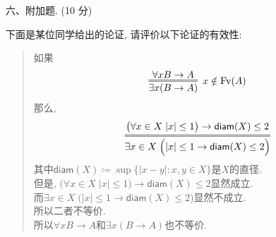 \documentclass[UTF8,11pt,colorlinks,aspectratio=43]{beamer}%
\DeclareMathOperator{\Fv}{Fv}
\begin{document}
\begin{frame}\frametitle{}

六、附加题. (10 分)
\begin{block}{}
下面是某位同学给出的论证, 请评价以下论证的有效性: 
	\begin{quote}
	如果
	\[\infer=[x\notin \Fv(A)]{\exists x(B\to A)}{\forall x B\to A}
	\]
	那么, 
	\[\infer={\exists x\in X\; \Big(|x|\leq 1\to \mathsf{diam}(X)\leq 2\Big)}{\big(\forall x\in X \; |x|\leq 1\big)\to \mathsf{diam}(X)\leq 2}\]
	其中$\mathsf{diam}(X)\coloneq \sup\big\{|x-y|:x,y\in X\big\}$是$X$的直径. \\
  但是, $\big(\forall x\in X \; |x|\leq 1\big)\to \mathsf{diam}(X)\leq 2$显然成立.\\ 
	而$\exists x\in X\; \Big(|x|\leq 1\to \mathsf{diam}(X)\leq 2\Big)$显然不成立.\\ 
	所以二者不等价. \\ 
	所以$\forall x B\to A$和$\exists x(B\to A)$也不等价. 
	\end{quote}
\end{block}
\end{frame}
\end{document}
